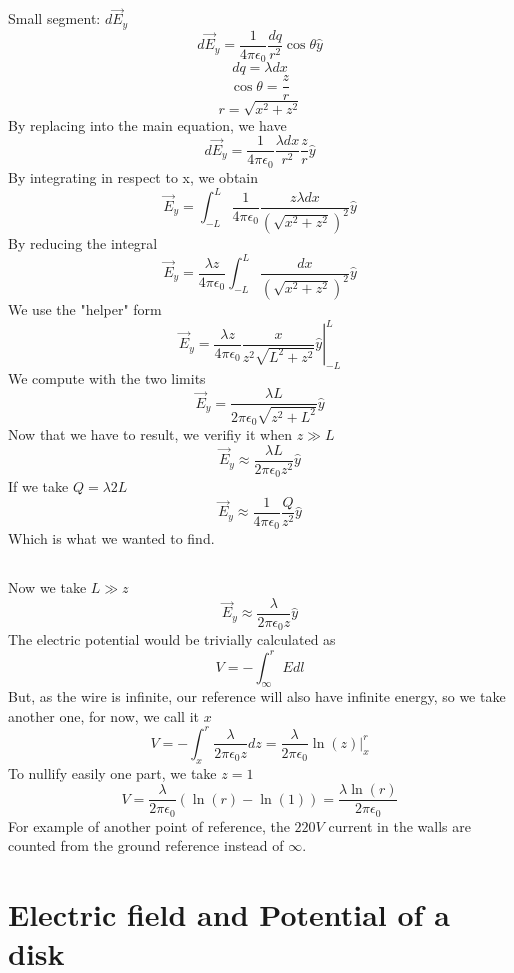 \documentclass{article}
\begin{document}
Small segment: \(d\vec{E}_y\)
\[
	d\vec{E}_y =
		\frac{1}{4 \pi \epsilon_0} \frac{dq}{r^2} \cos{\theta} \hat{y}
\]
\[
	dq = \lambda dx
\]
\[
	\cos{\theta} = \frac{z}{r}
\]
\[
	r = \sqrt{x^2+z^2}
\]
By replacing into the main equation, we have
\[
	d\vec{E}_y =
	\frac{1}{4 \pi \epsilon_0} \frac{\lambda dx}{r^2} \frac{z}{r} \hat{y}
\]
By integrating in respect to x, we obtain
\[
	\vec{E}_y =
	\int_{-L}^L \frac{1}{4 \pi \epsilon_0}
	\frac{z \lambda dx}{(\sqrt{x^2+z^2})^2} \hat{y}
\]
By reducing the integral
\[
	\vec{E}_y =
	\frac{\lambda z}{4 \pi \epsilon_0}
	\int_{-L}^L \frac{dx}{(\sqrt{x^2+z^2})^2} \hat{y}
\]
We use the "helper" form
\[
	\vec{E}_y =
	\frac{\lambda z}{4 \pi \epsilon_0}
	\left.\frac{x}{z^2 \sqrt{L^2+z^2}} \hat{y}\right|_{-L}^L
\]
We compute with the two limits
\[
	\vec{E}_y =
	\frac{\lambda L}{2 \pi \epsilon_0 \sqrt{z^2+L^2}} \hat{y}
\]
Now that we have to result, we verifiy it when \(z \gg L\)
\[
	\vec{E}_y \approx
	\frac{\lambda L}{2 \pi \epsilon_0 z^2} \hat{y}
\]
If we take \(Q = \lambda 2 L\)
\[
	\vec{E}_y \approx
	\frac{1}{4 \pi \epsilon_0} \frac{Q}{z^2} \hat{y}
\]
Which is what we wanted to find.

\subsection{}
Now we take \(L \gg z\)
\[
	\vec{E}_y \approx
	\frac{\lambda}{2 \pi \epsilon_0 z} \hat{y}
\]
The electric potential would be trivially calculated as
\[
	V = - \int_{\infty}^r E dl
\]
But, as the wire is infinite, our reference will also have infinite energy,
so we take another one, for now, we call it \(x\)
\[
	V = - \int_x^r \frac{\lambda}{2 \pi \epsilon_0 z} dz
	= \frac{\lambda}{2 \pi \epsilon_0} \left. \ln(z) \right |_x^r
\]
To nullify easily one part, we take \(z = 1\)
\[
	V = \frac{\lambda}{2 \pi \epsilon_0} (\ln(r) - \ln(1))
	= \frac{\lambda \ln(r)}{2 \pi \epsilon_0}
\]
For example of another point of reference, the \(220 V\) current in the walls
are counted from the ground reference instead of \(\infty\).

\section{Electric field and Potential of a disk}
\end{document}
